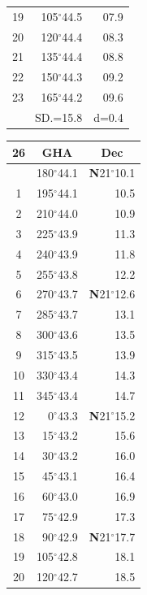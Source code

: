 \documentclass[10pt, a4paper]{report}
\begin{document}
\begin{scriptsize}
\begin{tabular*}{0.2\textwidth}[t]{@{\extracolsep{\fill}}|c|rr|}
19 & 105$^\circ$44.5 & 07.9\\
20 & 120$^\circ$44.4 & 08.3\\
21 & 135$^\circ$44.4 & \raisebox{0.24ex}{\boldmath$\cdot$~\boldmath$\cdot$~~}08.8\\
22 & 150$^\circ$44.3 & 09.2\\
23 & 165$^\circ$44.2 & 09.6\\
\hline
\rule{0pt}{2.4ex} & \multicolumn{1}{c}{SD.=15.8} & \multicolumn{1}{c|}{d=0.4}\\
\hline
\end{tabular*}\noindent
\begin{tabular*}{0.2\textwidth}[t]{@{\extracolsep{\fill}}|c|rr|}
\hline
\multicolumn{1}{|c|}{\rule{0pt}{2.6ex}\textbf{26}} & \multicolumn{1}{c}{\textbf{GHA}} & \multicolumn{1}{c|}{\textbf{Dec}}\\
\hline\rule{0pt}{2.6ex}\noindent
0 & 180$^\circ$44.1 & \textbf{N}21$^\circ$10.1\\
1 & 195$^\circ$44.1 & 10.5\\
2 & 210$^\circ$44.0 & 10.9\\
3 & 225$^\circ$43.9 & \raisebox{0.24ex}{\boldmath$\cdot$~\boldmath$\cdot$~~}11.3\\
4 & 240$^\circ$43.9 & 11.8\\
5 & 255$^\circ$43.8 & 12.2\\[2Pt]
6 & 270$^\circ$43.7 & \textbf{N}21$^\circ$12.6\\
7 & 285$^\circ$43.7 & 13.1\\
8 & 300$^\circ$43.6 & 13.5\\
9 & 315$^\circ$43.5 & \raisebox{0.24ex}{\boldmath$\cdot$~\boldmath$\cdot$~~}13.9\\
10 & 330$^\circ$43.4 & 14.3\\
11 & 345$^\circ$43.4 & 14.7\\[2Pt]
12 & 0$^\circ$43.3 & \textbf{N}21$^\circ$15.2\\
13 & 15$^\circ$43.2 & 15.6\\
14 & 30$^\circ$43.2 & 16.0\\
15 & 45$^\circ$43.1 & \raisebox{0.24ex}{\boldmath$\cdot$~\boldmath$\cdot$~~}16.4\\
16 & 60$^\circ$43.0 & 16.9\\
17 & 75$^\circ$42.9 & 17.3\\[2Pt]
18 & 90$^\circ$42.9 & \textbf{N}21$^\circ$17.7\\
19 & 105$^\circ$42.8 & 18.1\\
20 & 120$^\circ$42.7 & 18.5\\

\end{tabular*}
\end{scriptsize}
\end{document}
